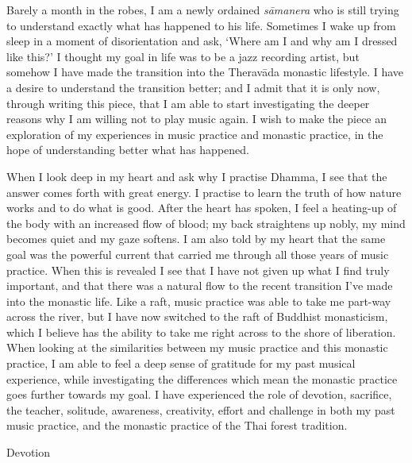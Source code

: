 
Barely a month in the robes, I am a newly ordained \emph{sāmanera} who
is still trying to understand exactly what has happened to his life.
Sometimes I wake up from sleep in a moment of disorientation and ask,
`Where am I and why am I dressed like this?' I thought my goal in life
was to be a jazz recording artist, but somehow I have made the
transition into the Theravāda  monastic lifestyle. I have a desire to
understand the transition better; and I admit that it is only now,
through writing this piece, that I am able to start investigating the
deeper reasons why I am willing not to play music again. I wish to make
the piece an exploration of my experiences in music practice and
monastic practice, in the hope of understanding better what has
happened.

When I look deep in my heart and ask why I practise Dhamma, I see that
the answer comes forth with great energy. I practise to learn the truth
of how nature works and to do what is good. After the heart has spoken,
I feel a heating-up of the body with an increased flow of blood; my back
straightens up nobly, my mind becomes quiet and my gaze softens. I am
also told by my heart that the same goal was the powerful current that
carried me through all those years of music practice. When this is
revealed I see that I have not given up what I find truly important, and
that there was a natural flow to the recent transition I've made into
the monastic life. Like a raft, music practice was able to take me
part-way across the river, but I have now switched to the raft of
Buddhist monasticism, which I believe has the ability to take me right
across to the shore of liberation. When looking at the similarities
between my music practice and this monastic practice, I am able to feel
a deep sense of gratitude for my past musical experience, while
investigating the differences which mean the monastic practice goes
further towards my goal. I have experienced the role of devotion,
sacrifice, the teacher, solitude, awareness, creativity, effort and
challenge in both my past music practice, and the monastic practice of
the Thai forest tradition.

Devotion

